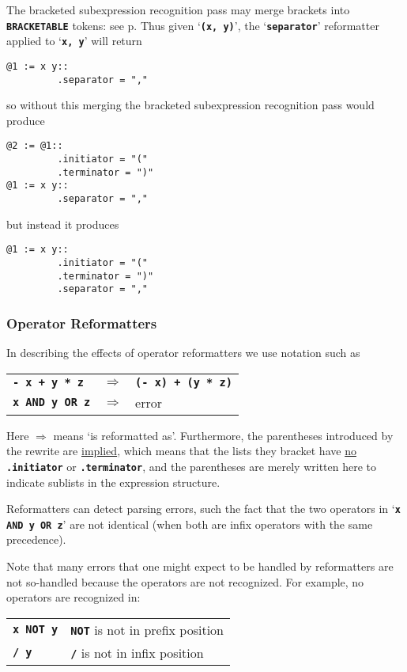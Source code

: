 \documentclass[12pt]{article}
\newcommand{\TT}[1]{{\tt \bfseries #1}}
\newcommand{\pagref}[1]{p\pageref{#1}}
\newenvironment{indpar}[1][0.3in]%
	{\begin{list}{}%
		     {\setlength{\itemsep}{0in}%
		      \setlength{\topsep}{0in}%
		      \setlength{\parsep}{1ex}%
		      \setlength{\labelwidth}{#1}%
		      \setlength{\leftmargin}{#1}%
		      \addtolength{\leftmargin}{\labelsep}}%
	 \item}%
	{\end{list}}
\begin{document}
The bracketed subexpression recognition pass may merge brackets
into \TT{BRACKETABLE} tokens: see \pagref{MERGING-BRACKETABLE-TOKENS}.
Thus given `\TT{(x, y)}', the `\TT{separator}' reformatter
applied to `\TT{x, y}' will return
\begin{indpar}\begin{verbatim}
@1 := x y::
         .separator = ","
\end{verbatim}\end{indpar}
so without this merging the bracketed subexpression recognition
pass would produce
\begin{indpar}\begin{verbatim}
@2 := @1::
         .initiator = "("
         .terminator = ")"
@1 := x y::
         .separator = ","
\end{verbatim}\end{indpar}
but instead it produces
\begin{indpar}\begin{verbatim}
@1 := x y::
         .initiator = "("
         .terminator = ")"
         .separator = ","
\end{verbatim}\end{indpar}

\subsubsection{Operator Reformatters}
\label{OPERATOR-REFORMATTERS}

In describing the effects of operator reformatters
we use notation such as

\hspace*{2em}\begin{tabular}{lcl}
\TT{- x + y * z} & $\Longrightarrow$ & \TT{(- x) + (y * z)} \\
\TT{x AND y OR z} & $\Longrightarrow$ & error
\end{tabular}

Here $\Longrightarrow$ means `is reformatted as'.  Furthermore, the
parentheses introduced by the rewrite are \underline{implied},
which means that the lists they bracket have \underline{no}
\TT{.initiator} or \TT{.terminator}, and the parentheses are
merely written here to indicate sublists in the expression structure.

Reformatters can detect parsing errors, such the fact that the two
operators in `\TT{x AND y OR z}' are not identical (when both are
infix operators with the same precedence).

Note that many errors that one might expect to be handled by
reformatters are not so-handled because the operators are not
recognized.  For example, no operators are recognized in:
\begin{center}
\begin{tabular}{l@{~~~~~~~~~~}l}
\TT{x NOT y}	& \TT{NOT} is not in prefix position \\
\TT{/ y}	& \TT{/} is not in infix position \\
\end{tabular}
\end{center}
\end{document}
